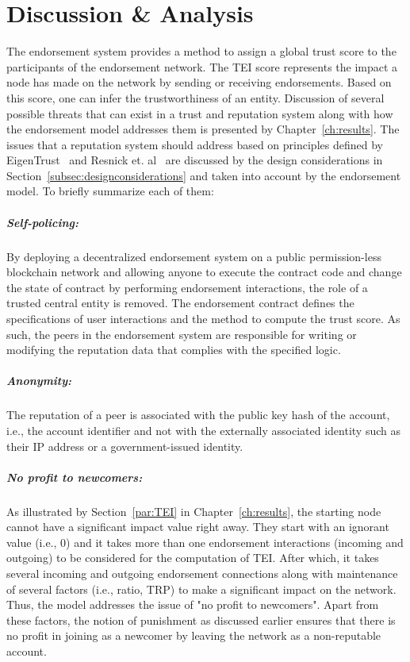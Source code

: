 \chapter{Discussion \& Analysis} \label{ch:discussion}
The endorsement system provides a method to assign a global trust score to the
participants of the endorsement network. The \ac{TEI} score represents the
impact a node has made on the network by sending or receiving endorsements.
Based on this score, one can infer the trustworthiness of an entity. Discussion
of several possible threats that can exist in a trust and reputation system
along with how the endorsement model addresses them is presented by
Chapter~\ref{ch:results}. The issues that a reputation system should address
based on principles defined by EigenTrust~\cite{kamvar2003eigentrust} and
Resnick et. al~\cite{resnick2000reputation} are discussed by the design
considerations in Section~\ref{subsec:designconsiderations} and taken into
account by the endorsement model. To briefly summarize each of them:  

\paragraph{Self-policing:}By deploying a decentralized endorsement system on a
public permission-less blockchain network and allowing anyone to execute the
contract code and change the state of contract by performing endorsement
interactions, the role of a trusted central entity is removed. The endorsement
contract defines the specifications of user interactions and the method to
compute the trust score. As such, the peers in the endorsement system are
responsible for writing or modifying the reputation data that complies with the
specified logic.   
\paragraph{Anonymity:} The reputation of a peer is associated with the public
key hash of the account, i.e., the account identifier and not with the
externally associated identity such as their IP address or a government-issued
identity.  
\paragraph{No profit to newcomers:}As illustrated by Section~\ref{par:TEI} in
Chapter~\ref{ch:results}, the starting node cannot have a significant impact
value right away. They start with an ignorant value (i.e., 0) and it takes more
than one endorsement interactions (incoming and outgoing) to be considered for
the computation of \ac{TEI}. After which, it takes several incoming and
outgoing endorsement connections along with maintenance of several factors
(i.e., ratio, \ac{TRP}) to make a significant impact on the network. Thus, the
model addresses the issue of "no profit to newcomers". Apart from these
factors, the notion of punishment as discussed earlier ensures that there is no
profit in joining as a newcomer by leaving the network as a non-reputable
account.   

